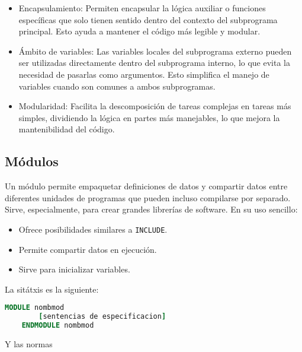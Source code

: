 \begin{itemize}

	\item Encapsulamiento: Permiten encapsular la lógica auxiliar o funciones específicas que solo tienen sentido dentro del contexto del subprograma principal. Esto ayuda a mantener el código más legible y modular.

	\item Ámbito de variables: Las variables locales del subprograma externo pueden ser utilizadas directamente dentro del subprograma interno, lo que evita la necesidad de pasarlas como argumentos. Esto simplifica el manejo de variables cuando son comunes a ambos subprogramas.

	\item Modularidad: Facilita la descomposición de tareas complejas en tareas más simples, dividiendo la lógica en partes más manejables, lo que mejora la mantenibilidad del código.

\end{itemize}


\subsection{Módulos}

Un módulo permite empaquetar definiciones de datos y compartir datos entre diferentes unidades de programas que pueden incluso compilarse por separado. Sirve, especialmente, para crear grandes librerías de software. En su uso sencillo:

\begin{itemize}
	\item Ofrece posibilidades similares a {\tt INCLUDE}.
	\item Permite compartir datos en ejecución.
	\item Sirve para inicializar variables.
\end{itemize}

La sitátxis es la siguiente:

\begin{lstlisting}[language=Fortran]
	MODULE nombmod
		[sentencias de especificacion]
	ENDMODULE nombmod
\end{lstlisting}
Y las normas

